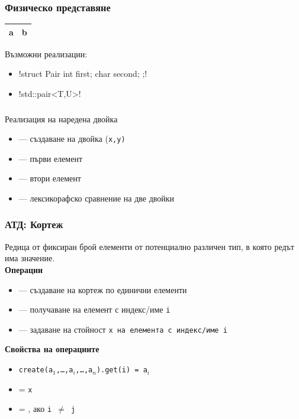 \documentclass{beamer}
\begin{document}
\begin{frame}[fragile]
  \frametitle{Физическо представяне}

  \begin{center}
    \begin{tabular}{|m{5ex}|m{8ex}|}
      \hline
      \rowcolor{diagramblue}
      a&b\\
      \hline
    \end{tabular}
  \end{center}
  \vspace{2em}

  Възможни реализации:
  \begin{itemize}[<+->]
  \item \lst!struct Pair { int first; char second; };!
  \item \lst!std::pair<T,U>!
  \end{itemize}
\end{frame}

\begin{frame}
  \frametitle{}

  Реализация на наредена двойка
  \begin{itemize}
  \item {} --- създаване на двойка (\tt x,\tt y)
  \item {} --- първи елемент
  \item {} --- втори елемент
  \item \lst{==,!=,<,>,<=,>=} --- лексикорафско сравнение на две двойки
  \end{itemize}
\end{frame}

\begin{frame}
  \frametitle{АТД: Кортеж}

  Редица от фиксиран брой елементи от потенциално различен тип, в която редът има значение.\\[0.5em]

  \textbf{Операции}\\[0.5em]
  \begin{itemize}
  \item {} --- създаване на кортеж по единични елементи
  \item {} --- получаване на елемент с индекс/име \tt i
  \item {} --- задаване на стойност \tt x на елемента с индекс/име \tt i
  \end{itemize}

  \textbf{Свойства на операциите}\\[0.5em]
  \begin{itemize}
  \item \tt{create(a$_1$,\ldots,a$_i$,\ldots,a$_n$).get(i)} = \tt{a$_i$}
  \item {} = \tt x
  \item {} = , ако \tt{i $\neq$ j}
  \end{itemize}
\end{frame}
\end{document}
